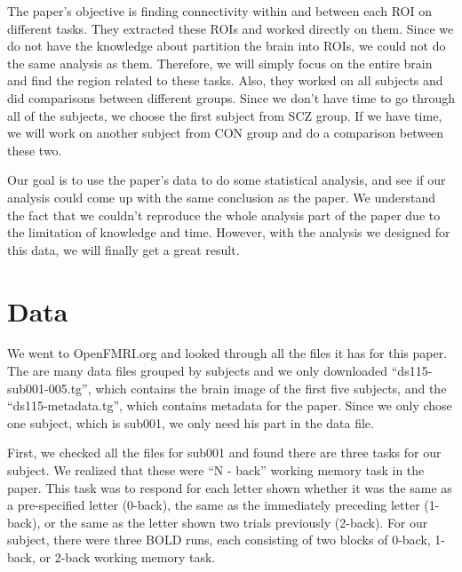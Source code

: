 \documentclass[11pt]{article}
\begin{document}
The paper's objective is finding connectivity within and between each ROI on different tasks. They extracted these ROIs and worked directly on them. Since we do not have the knowledge about partition the brain into ROIs, we could not do the same analysis as them. Therefore, we will simply focus on the entire brain and find the region related to these tasks. Also, they worked on all subjects and did comparisons between different groups. Since we don't have time to go through all of the subjects, we choose the first subject from SCZ group. If we have time, we will work on another subject from CON group and do a comparison between these two.

Our goal is to use the paper's data to do some statistical analysis, and see if our analysis could come up with the same conclusion as the paper. We understand the fact that we couldn't reproduce the whole analysis part of the paper due to the limitation of knowledge and time. However, with the analysis we designed for this data, we will finally get a great result.


\section{Data}

We went to OpenFMRI.org and looked through all the files it has for this paper. The are many data files grouped by subjects and we only downloaded ``ds115-sub001-005.tg'', which contains the brain image of the first five subjects, and the ``ds115-metadata.tg'', which contains metadata for the paper. Since we only chose one subject, which is sub001, we only need his part in the data file. 

First, we checked all the files for sub001 and found there are three tasks for our subject. We realized that these were ``N - back'' working memory task in the paper. This task was to respond for each letter shown whether it was the same as a pre-specified letter (0-back), the same as the immediately preceding letter (1-back), or the same as the letter shown two trials previously (2-back). For our subject, there were three BOLD runs, each consisting of two blocks of 0-back, 1-back, or 2-back working memory task. 
\end{document}
